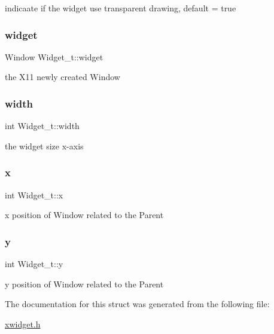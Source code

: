 indicaate if the widget use transparent drawing, default = true \mbox{\label{structWidget__t_acb2bfb41674371ee1220a9d6a2d89fb1}} 
\subsubsection{\texorpdfstring{widget}{widget}}
{\footnotesize\ttfamily Window Widget\+\_\+t\+::widget}

the X11 newly created Window \mbox{\label{structWidget__t_a3204c88196ed5793250b3530dd719037}} 
\subsubsection{\texorpdfstring{width}{width}}
{\footnotesize\ttfamily int Widget\+\_\+t\+::width}

the widget size x-\/axis \mbox{\label{structWidget__t_aac6ce7621b682bb4ce88bac9181c34a7}} 
\subsubsection{\texorpdfstring{x}{x}}
{\footnotesize\ttfamily int Widget\+\_\+t\+::x}

x position of Window related to the Parent \mbox{\label{structWidget__t_acb9402de44e47837e1821b93fc052b38}} 
\subsubsection{\texorpdfstring{y}{y}}
{\footnotesize\ttfamily int Widget\+\_\+t\+::y}

y position of Window related to the Parent 

The documentation for this struct was generated from the following file\+:\begin{DoxyCompactItemize}
\item 
\hyperlink{xwidget_8h}{xwidget.\+h}\end{DoxyCompactItemize}

